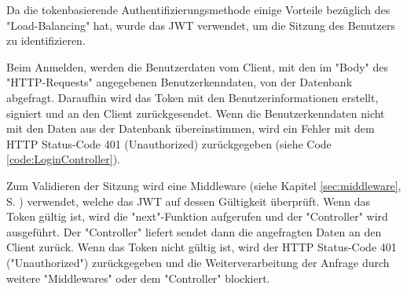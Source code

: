 
Da die tokenbasierende Authentifizierungsmethode einige Vorteile bezüglich des "Load-Balancing" hat, wurde das JWT verwendet, um die Sitzung des Benutzers zu identifizieren.



Beim Anmelden, werden die Benutzerdaten vom Client, mit den im "Body" des "HTTP-Requests" angegebenen Benutzerkenndaten, von der Datenbank abgefragt. 
Daraufhin wird das Token mit den Benutzerinformationen erstellt, signiert und an den Client zurückgesendet. 
Wenn die Benutzerkenndaten nicht mit den Daten aus der Datenbank übereinstimmen, wird ein Fehler mit dem HTTP Status-Code 401 (Unauthorized) zurückgegeben (siehe Code \ref{code:LoginController}).


\pagebreak
{}

Zum Validieren der Sitzung wird eine Middleware (siehe Kapitel \ref{sec:middleware}, S. \pageref{sec:middleware}) verwendet, welche das JWT auf dessen Gültigkeit überprüft. 
Wenn das Token gültig ist, wird die "next"-Funktion aufgerufen und der "Controller" wird ausgeführt. Der "Controller" liefert sendet dann die angefragten Daten an den Client zurück. 
Wenn das Token nicht gültig ist, wird der HTTP Status-Code 401 ("Unauthorized") zurückgegeben und die Weiterverarbeitung der Anfrage durch weitere "Middlewares" oder dem "Controller" blockiert.

